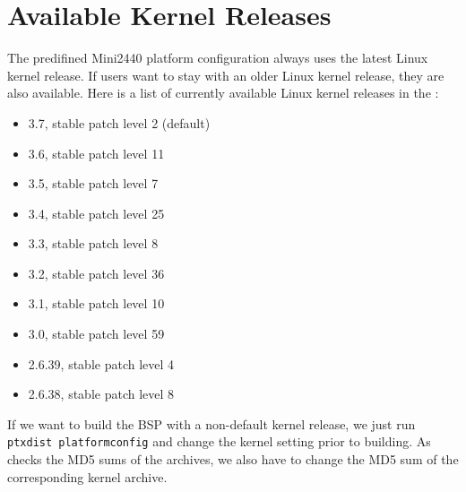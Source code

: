 %
%
%
%
%
%

\newcommand{\perCpuName}{S3C2440}
\newcommand{\curKernelRev}{3.7}

\section{Available Kernel Releases}	\label{sec:kernelreleases}

The predifined Mini2440 platform configuration always uses the latest Linux
kernel release. If users want to stay with an older Linux kernel release,
they are also available. Here is a list of currently available Linux kernel
releases in the \ptxdistBSPName{}:

\begin{itemize}
	\item \curKernelRev{}, stable patch level 2 (default)
	\item 3.6, stable patch level 11
	\item 3.5, stable patch level 7
	\item 3.4, stable patch level 25
	\item 3.3, stable patch level 8
	\item 3.2, stable patch level 36
	\item 3.1, stable patch level 10
	\item 3.0, stable patch level 59
	\item 2.6.39, stable patch level 4
	\item 2.6.38, stable patch level 8
\end{itemize}

If we want to build the BSP with a non-default kernel release, we just run
\texttt{ptxdist platformconfig} and change the kernel setting prior to building.
As \ptxdist{} checks the MD5 sums of the archives, we also have to change the
MD5 sum of the corresponding kernel archive.

